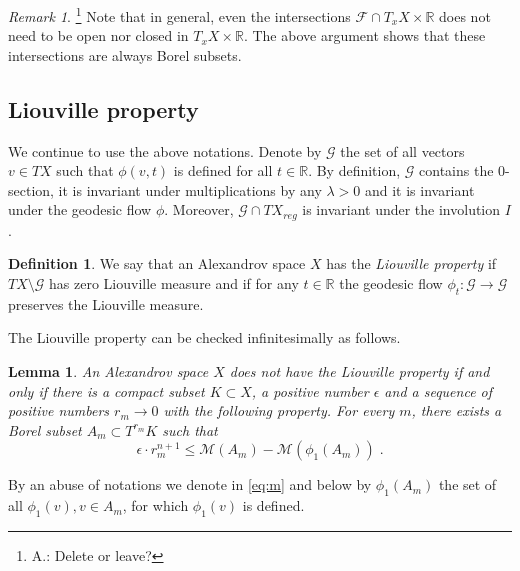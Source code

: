 \documentclass[12pt,leqno,intlimits]{amsart}
\numberwithin{equation}{section}
\newtheorem{lem}[thm]{Lemma}
\theoremstyle{definition}
\newtheorem{defn}[thm]{Definition}%
\theoremstyle{remark}
\newtheorem{rem}[thm]{Remark}
\newcommand{\R}{\mathbb{R}}
\def\:{\colon}
\begin{document}
\begin{rem}  \footnote{A.: Delete or leave? }
Note that in general, even the intersections $\mathcal F\cap T_xX \times \R$ does not need to be open nor closed in $T_xX \times \R$.
The above argument shows that these intersections are always Borel subsets.
\end{rem}






\subsection{Liouville property}
We continue to use the above notations.
 Denote by $\mathcal G$ the set of all vectors $v\in TX $ such that $\phi (v,t)$ is defined for all $t\in \R$. By definition, $\mathcal G$ contains the $0$-section, it
 is invariant under multiplications by any $\lambda >0$  and it is invariant under the geodesic flow $\phi$. Moreover, $\mathcal G\cap TX_{reg}$ is invariant under the involution $I$.
  \begin{defn}
 We say that an Alexandrov space $X$ has the \emph{Liouville property} if  $TX\setminus \mathcal G$ has zero Liouville measure  and if
for any $t\in \R$ the geodesic flow $\phi _t \:\mathcal G\to \mathcal G$ preserves the Liouville measure.
 \end{defn}

The Liouville property can be checked infinitesimally as follows.

\begin{lem} \label{infini}
An Alexandrov space $X$ does not have the Liouville property if and only if there is a compact subset $K\subset X$, a positive number
$\epsilon$ and a sequence of positive numbers  $r_m \to 0$  with the following property.
 For every  $m$, there exists a Borel subset $A_m\subset T^{r_ m} K$ such that
 \begin{equation} \label{eq:m}
\epsilon \cdot r_m^{n +1} \leq \mathcal M (A_m) -\mathcal M (\phi _1 (A_m)) \;.
\end{equation}
\end{lem}
By an abuse of notations we denote in \eqref{eq:m}  and below by  $\phi_1 (A_m)$ the set of all $\phi _1(v), v\in A_m$, for which
$\phi _1(v)$ is defined.
\end{document}
